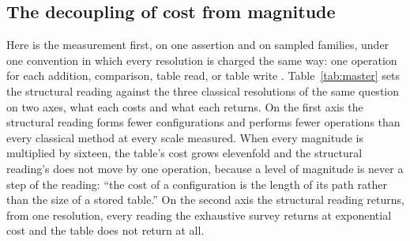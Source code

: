 \documentclass[pdflatex,sn-mathphys-num]{sn-jnl}
\theoremstyle{thmstyleone}%
\theoremstyle{thmstyletwo}%
\theoremstyle{thmstylethree}%
\newcommand{\q}[1]{``#1''}        %
\begin{document}
\subsection{The decoupling of cost from magnitude}
Here is the measurement first, on one assertion and on sampled families, under one convention in which every resolution is charged the same way: one operation for each addition, comparison, table read, or table write \citep{CookReckhow1973}. Table~\ref{tab:master} sets the structural reading against the three classical resolutions of the same question on two axes, what each costs and what each returns. On the first axis the structural reading forms fewer configurations and performs fewer operations than every classical method at every scale measured. When every magnitude is multiplied by sixteen, the table's cost grows elevenfold and the structural reading's does not move by one operation, because a level of magnitude is never a step of the reading: \q{the cost of a configuration is the length of its path rather than the size of a stored table.} On the second axis the structural reading returns, from one resolution, every reading the exhaustive survey returns at exponential cost and the table does not return at all.
\end{document}
